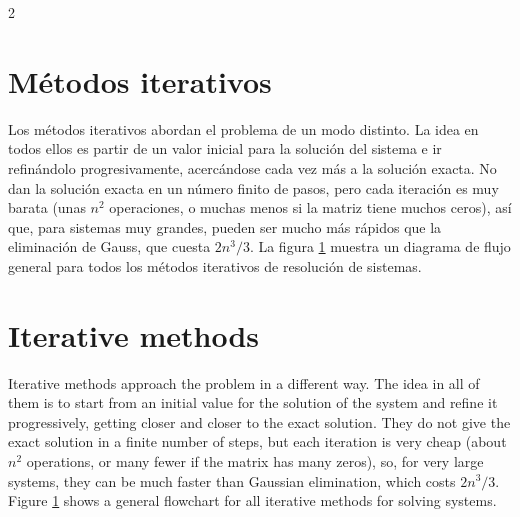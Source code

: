 \begin{paracol}{2}
\section{Métodos iterativos}
Los métodos iterativos abordan el problema de un modo distinto. La idea en todos ellos es partir de un valor inicial para la solución del sistema e ir refinándolo progresivamente, acercándose cada vez más a la solución exacta. No dan la solución exacta en un número finito de pasos, pero cada iteración es muy barata (unas $n^2$ operaciones, o muchas menos si la matriz tiene muchos ceros), así que, para sistemas muy grandes, pueden ser mucho más rápidos que la eliminación de Gauss, que cuesta $2n^3/3$. La figura \ref{fig:itera} muestra un diagrama de flujo general para todos los métodos iterativos de resolución de sistemas.

\switchcolumn
\section{Iterative methods}
Iterative methods approach the problem in a different way. The idea in all of them is to start from an initial value for the solution of the system and refine it progressively, getting closer and closer to the exact solution. They do not give the exact solution in a finite number of steps, but each iteration is very cheap (about $n^2$ operations, or many fewer if the matrix has many zeros), so, for very large systems, they can be much faster than Gaussian elimination, which costs $2n^3/3$. Figure \ref{fig:itera} shows a general flowchart for all iterative methods for solving systems.

\end{paracol}

\begin{figure}[h]
\centering
{}
\label{fig:itera}
\end{figure}

